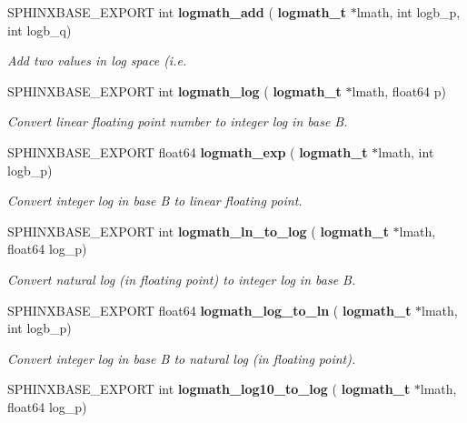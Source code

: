 \begin{DoxyCompactItemize}
S\+P\+H\+I\+N\+X\+B\+A\+S\+E\+\_\+\+E\+X\+P\+O\+RT int \textbf{ logmath\+\_\+add} (\textbf{ logmath\+\_\+t} $\ast$lmath, int logb\+\_\+p, int logb\+\_\+q)
\begin{DoxyCompactList}\small\item\em Add two values in log space (i.\+e. \end{DoxyCompactList}\item 
\mbox{\label{logmath_8h_aebb4711268322fa7aec31e5798fe7e90}} 
S\+P\+H\+I\+N\+X\+B\+A\+S\+E\+\_\+\+E\+X\+P\+O\+RT int \textbf{ logmath\+\_\+log} (\textbf{ logmath\+\_\+t} $\ast$lmath, float64 p)
\begin{DoxyCompactList}\small\item\em Convert linear floating point number to integer log in base B. \end{DoxyCompactList}\item 
\mbox{\label{logmath_8h_ae8b0a168e29e448c0d6de66dc46e099e}} 
S\+P\+H\+I\+N\+X\+B\+A\+S\+E\+\_\+\+E\+X\+P\+O\+RT float64 \textbf{ logmath\+\_\+exp} (\textbf{ logmath\+\_\+t} $\ast$lmath, int logb\+\_\+p)
\begin{DoxyCompactList}\small\item\em Convert integer log in base B to linear floating point. \end{DoxyCompactList}\item 
\mbox{\label{logmath_8h_a52eff2c778ad758888b03ac5efcdccea}} 
S\+P\+H\+I\+N\+X\+B\+A\+S\+E\+\_\+\+E\+X\+P\+O\+RT int \textbf{ logmath\+\_\+ln\+\_\+to\+\_\+log} (\textbf{ logmath\+\_\+t} $\ast$lmath, float64 log\+\_\+p)
\begin{DoxyCompactList}\small\item\em Convert natural log (in floating point) to integer log in base B. \end{DoxyCompactList}\item 
\mbox{\label{logmath_8h_a8035e176636eae8b4e02fe488f25457a}} 
S\+P\+H\+I\+N\+X\+B\+A\+S\+E\+\_\+\+E\+X\+P\+O\+RT float64 \textbf{ logmath\+\_\+log\+\_\+to\+\_\+ln} (\textbf{ logmath\+\_\+t} $\ast$lmath, int logb\+\_\+p)
\begin{DoxyCompactList}\small\item\em Convert integer log in base B to natural log (in floating point). \end{DoxyCompactList}\item 
\mbox{\label{logmath_8h_aacb4dddeed63a61fb927915f7e3a642e}} 
S\+P\+H\+I\+N\+X\+B\+A\+S\+E\+\_\+\+E\+X\+P\+O\+RT int \textbf{ logmath\+\_\+log10\+\_\+to\+\_\+log} (\textbf{ logmath\+\_\+t} $\ast$lmath, float64 log\+\_\+p)

\end{DoxyCompactItemize}
